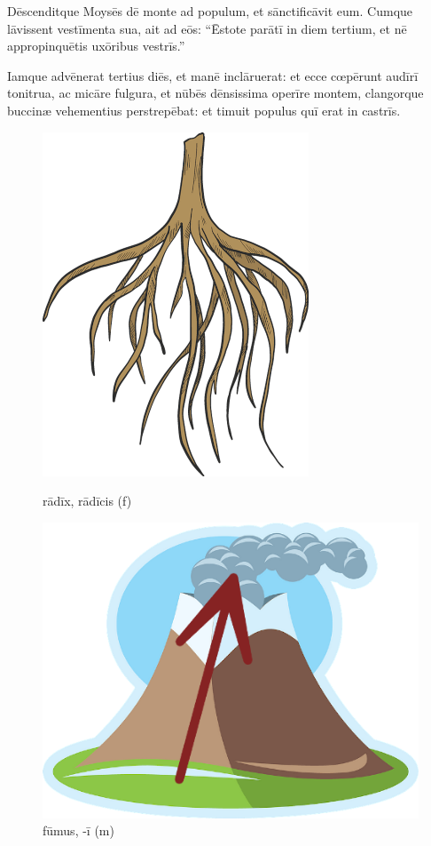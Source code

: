 Dēscenditque Moysēs dē monte ad populum, et sānctificāvit eum. Cumque
lāvissent vestīmenta sua, 
ait ad eōs: ``Ēstote parātī in diem tertium, et
nē appropinquētis uxōribus vestrīs.''

Iamque advēnerat tertius diēs, et
manē inclāruerat: et ecce cœpērunt audīrī tonitrua, ac
micāre fulgura, et nūbēs dēnsissima operīre montem, clangorque
buccinæ vehementius
perstrepēbat: et timuit populus quī erat in castrīs. 

\begin{figure}[hp]
    \begin{minipage}[hbp]{0.5\linewidth}
        \centering
        \includegraphics{root}
        \caption{rādīx, rādīcis (f)}
    \end{minipage}%
    \begin{minipage}[hbp]{0.5\linewidth}
        \centering
        \includegraphics{fumus}
        \caption{fūmus, -ī (m)}
    \end{minipage}
\end{figure}

